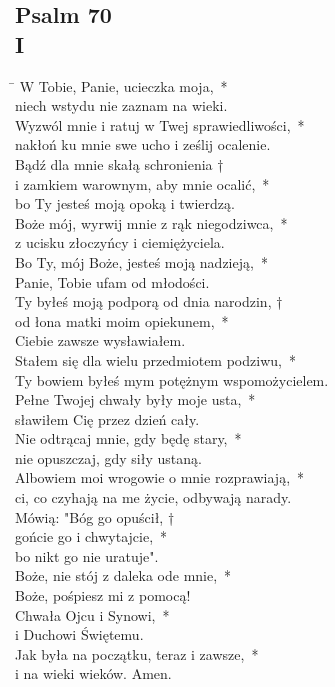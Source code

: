 \subsection*{Psalm 70\\I}
\begin{tabbing}
\hspace{4mm} \= \>\kill
W Tobie, Panie, ucieczka moja,~*\\
niech wstydu nie zaznam na wieki.\\
\>Wyzwól mnie i ratuj w Twej sprawiedliwości,~*\\
\>nakłoń ku mnie swe ucho i ześlij ocalenie.\\
Bądź dla mnie skałą schronienia †\\
i zamkiem warownym, aby mnie ocalić,~*\\
bo Ty jesteś moją opoką i twierdzą.\\
\>Boże mój, wyrwij mnie z rąk niegodziwca,~*\\
\>z ucisku złoczyńcy i ciemiężyciela.\\
Bo Ty, mój Boże, jesteś moją nadzieją,~*\\
Panie, Tobie ufam od młodości.\\
\>Ty byłeś moją podporą od dnia narodzin, †\\
\>od łona matki moim opiekunem,~*\\
\>Ciebie zawsze wysławiałem.\\
Stałem się dla wielu przedmiotem podziwu,~*\\
Ty bowiem byłeś mym potężnym wspomożycielem.\\
\>Pełne Twojej chwały były moje usta,~*\\
\>sławiłem Cię przez dzień cały.\\
Nie odtrącaj mnie, gdy będę stary,~*\\
nie opuszczaj, gdy siły ustaną.\\
\>Albowiem moi wrogowie o mnie rozprawiają,~*\\
\>ci, co czyhają na me życie, odbywają narady.\\
Mówią: "Bóg go opuścił, †\\
gońcie go i chwytajcie,~*\\
bo nikt go nie uratuje".\\
\>Boże, nie stój z daleka ode mnie,~*\\
\>Boże, pośpiesz mi z pomocą!\\
Chwała Ojcu i Synowi,~*\\
i Duchowi Świętemu.\\
\>Jak była na początku, teraz i zawsze,~*\\
\>i na wieki wieków. Amen.
\end{tabbing}


